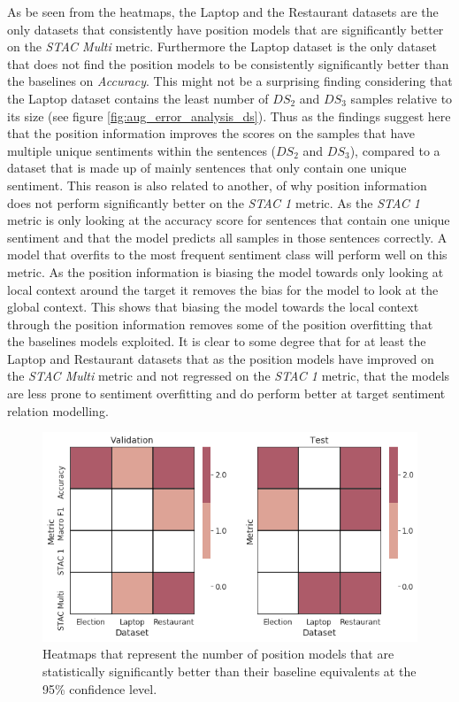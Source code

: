 As be seen from the heatmaps, the Laptop and the Restaurant datasets are the only datasets that consistently have position models that are significantly better on the \textit{STAC Multi} metric. Furthermore the Laptop dataset is the only dataset that does not find the position models to be consistently significantly better than the baselines on \textit{Accuracy}. This might not be a surprising finding considering that the Laptop dataset contains the least number of $DS_2$ and $DS_3$ samples relative to its size (see figure \ref{fig:aug_error_analysis_ds}). Thus as the findings suggest here that the position information improves the scores on the samples that have multiple unique sentiments within the sentences ($DS_2$ and $DS_3$), compared to a dataset that is made up of mainly sentences that only contain one unique sentiment. This reason is also related to another, of why position information does not perform significantly better on the \textit{STAC 1} metric. As the \textit{STAC 1} metric is only looking at the accuracy score for sentences that contain one unique sentiment and that the model predicts all samples in those sentences correctly. A model that overfits to the most frequent sentiment class will perform well on this metric. As the position information is biasing the model towards only looking at local context around the target it removes the bias for the model to look at the global context. This shows that biasing the model towards the local context through the position information removes some of the position overfitting that the baselines models exploited. It is clear to some degree that for at least the Laptop and Restaurant datasets that as the position models have improved on the \textit{STAC Multi} metric and not regressed on the \textit{STAC 1} metric, that the models are less prone to sentiment overfitting and do perform better at target sentiment relation modelling.

\begin{figure}[h!]
    \centering
    \includegraphics[scale=0.5]{images/augmentation/methods_performance/Position_Encoding/position_overall_sig_models.png}
    \caption{Heatmaps that represent the number of position models that are statistically significantly better than their baseline equivalents at the 95\% confidence level.}
    \label{fig:aug_position_overall_sig_models}
\end{figure}


